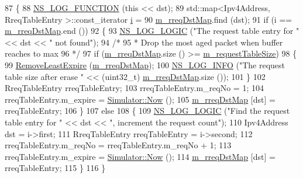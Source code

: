 \begin{DoxyCode}
87 \{
88   \hyperlink{log-macros-disabled_8h_a90b90d5bad1f39cb1b64923ea94c0761}{NS\_LOG\_FUNCTION} (\textcolor{keyword}{this} << dst);
89   std::map<Ipv4Address, RreqTableEntry >::const\_iterator \hyperlink{bernuolliDistribution_8m_a6f6ccfcf58b31cb6412107d9d5281426}{i} =
90     \hyperlink{classns3_1_1dsr_1_1DsrRreqTable_a7cb611a29059faab6ffb9532e15d4166}{m\_rreqDstMap}.find (dst);
91   \textcolor{keywordflow}{if} (i == \hyperlink{classns3_1_1dsr_1_1DsrRreqTable_a7cb611a29059faab6ffb9532e15d4166}{m\_rreqDstMap}.end ())
92     \{
93       \hyperlink{group__logging_ga88acd260151caf2db9c0fc84997f45ce}{NS\_LOG\_LOGIC} (\textcolor{stringliteral}{"The request table entry for "} << dst << \textcolor{stringliteral}{" not found"});
94       \textcolor{comment}{/*}
95 \textcolor{comment}{       * Drop the most aged packet when buffer reaches to max}
96 \textcolor{comment}{       */}
97       \textcolor{keywordflow}{if} (\hyperlink{classns3_1_1dsr_1_1DsrRreqTable_a7cb611a29059faab6ffb9532e15d4166}{m\_rreqDstMap}.size () >= \hyperlink{classns3_1_1dsr_1_1DsrRreqTable_aa0a03f05e32aa1ac047ad091154e8215}{m\_requestTableSize})
98         \{
99           \hyperlink{classns3_1_1dsr_1_1DsrRreqTable_aff44d7a02a9b024e5a77d035e6453a9e}{RemoveLeastExpire} (\hyperlink{classns3_1_1dsr_1_1DsrRreqTable_a7cb611a29059faab6ffb9532e15d4166}{m\_rreqDstMap});
100           \hyperlink{group__logging_gafbd73ee2cf9f26b319f49086d8e860fb}{NS\_LOG\_INFO} (\textcolor{stringliteral}{"The request table size after erase "} << (uint32\_t)
      \hyperlink{classns3_1_1dsr_1_1DsrRreqTable_a7cb611a29059faab6ffb9532e15d4166}{m\_rreqDstMap}.size ());
101         \}
102       RreqTableEntry rreqTableEntry;
103       rreqTableEntry.m\_reqNo = 1;
104       rreqTableEntry.m\_expire = \hyperlink{classns3_1_1Simulator_ac3178fa975b419f7875e7105be122800}{Simulator::Now} ();
105       \hyperlink{classns3_1_1dsr_1_1DsrRreqTable_a7cb611a29059faab6ffb9532e15d4166}{m\_rreqDstMap} [dst] = rreqTableEntry;
106     \}
107   \textcolor{keywordflow}{else}
108     \{
109       \hyperlink{group__logging_ga88acd260151caf2db9c0fc84997f45ce}{NS\_LOG\_LOGIC} (\textcolor{stringliteral}{"Find the request table entry for  "} << dst << \textcolor{stringliteral}{", increment the request
       count"});
110       Ipv4Address dst = i->first;
111       RreqTableEntry rreqTableEntry = i->second;
112       rreqTableEntry.m\_reqNo = rreqTableEntry.m\_reqNo + 1;
113       rreqTableEntry.m\_expire = \hyperlink{classns3_1_1Simulator_ac3178fa975b419f7875e7105be122800}{Simulator::Now} ();
114       \hyperlink{classns3_1_1dsr_1_1DsrRreqTable_a7cb611a29059faab6ffb9532e15d4166}{m\_rreqDstMap} [dst] = rreqTableEntry;
115     \}
116 \}
\end{DoxyCode}


